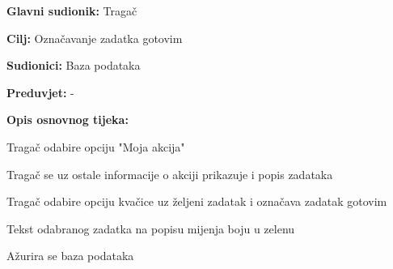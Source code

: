 					\noindent {}
					\begin{packed_item}
	
						\item \textbf{Glavni sudionik: } Tragač
						\item  \textbf{Cilj:} Označavanje zadatka gotovim
						\item  \textbf{Sudionici:} Baza podataka
						\item  \textbf{Preduvjet:} -
						\item  \textbf{Opis osnovnog tijeka:}
						
						\item[] \begin{packed_enum}
						
							\item Tragač odabire opciju "Moja akcija"
							\item Tragač se uz ostale informacije o akciji prikazuje i popis zadataka
							\item Tragač odabire opciju kvačice uz željeni zadatak i označava zadatak gotovim
							\item Tekst odabranog zadatka na popisu mijenja boju u zelenu
							\item Ažurira se baza podataka
						
						\end{packed_enum}
					\end{packed_item}
					\noindent {}
